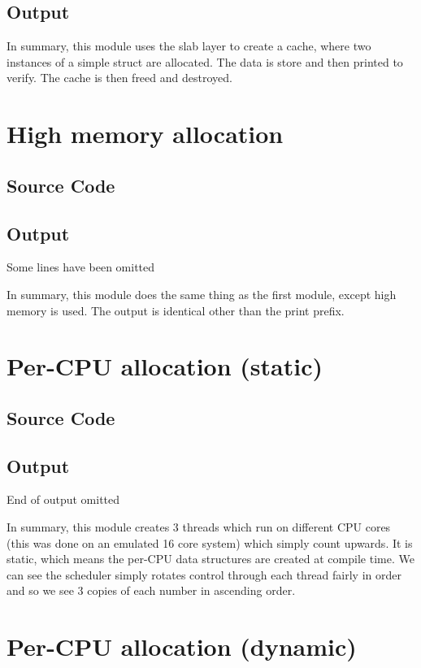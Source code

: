 \documentclass{article}
\begin{document}
\subsection{Output}

In summary, this module uses the slab layer to create a cache, where two instances of a simple struct are allocated. The data is store and then printed to verify. The cache is then freed and destroyed.

\section{High memory allocation}

\subsection{Source Code}

\subsection{Output}
Some lines have been omitted

In summary, this module does the same thing as the first module, except high memory is used. The output is identical other than the print prefix.

\section{Per-CPU allocation (static)}

\subsection{Source Code}

\subsection{Output}
End of output omitted

In summary, this module creates 3 threads which run on different CPU cores (this was done on an emulated 16 core system) which simply count upwards. It is static, which means the per-CPU data structures are created at compile time. We can see the scheduler simply rotates control through each thread fairly in order and so we see 3 copies of each number in ascending order. 

\section{Per-CPU allocation (dynamic)}
\end{document}
